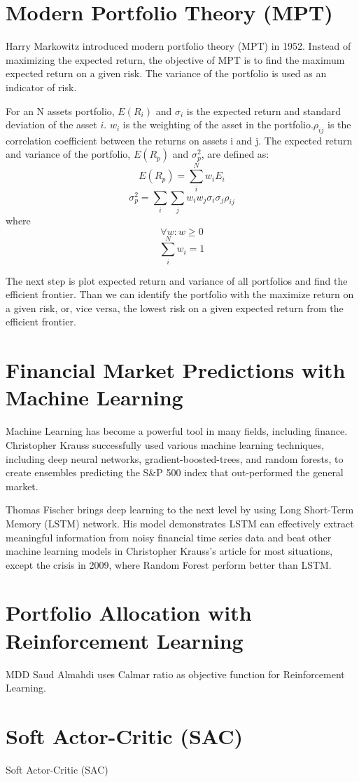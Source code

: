 \section{Modern Portfolio Theory (MPT)}
Harry Markowitz introduced modern portfolio theory (MPT) in 1952. Instead of maximizing the expected return, the objective of MPT is to find the maximum expected return on a given risk. The variance of the portfolio is used as an indicator of risk. \cite{10.2307/2975974}
\par
For an N assets portfolio, \(E(R_i)\) and  \(\sigma_i\) is the expected return and standard deviation of the asset \(i\). \(w_i\) is the weighting of the asset in the portfolio.\(\rho_{ij}\) is the correlation coefficient between the returns on assets i and j.
The expected return and variance of the portfolio, \(E(R_p)\) and \(\sigma_p^2\), are defined as:
\[ E(R_p) = \sum_i^N w_i E_i\]
\[\sigma_p^2 = \sum_i \sum_j w_i w_j \sigma_i \sigma_j \rho_{ij}\]
where
\[\forall w: w \geq 0\]
\[\sum_i ^N w_i = 1\]
\par
The next step is plot expected return and variance of all portfolios and find the efficient frontier. Than we can identify the portfolio with the maximize return on a given risk, or, vice versa, the lowest risk on a given expected return from the efficient frontier.

\section{Financial Market Predictions with Machine Learning}
Machine Learning has become a powerful tool in many fields, including finance. Christopher Krauss successfully used various machine learning techniques, including deep neural networks, gradient-boosted-trees, and random forests, to create ensembles predicting the S\&P 500 index that out-performed the general market. \cite{KRAUSS2017689} 
\par

Thomas Fischer brings deep learning to the next level by using Long Short-Term Memory (LSTM) network.\cite{FISCHER2018654} His model demonstrates LSTM can effectively extract meaningful information from noisy financial time series data and beat other machine learning models in  Christopher Krauss's article  \cite{KRAUSS2017689} for most situations, except the crisis in 2009, where Random Forest perform better than LSTM.

\section{Portfolio Allocation with Reinforcement Learning}
MDD\cite{magdon2004maximum}
Saud Almahdi uses Calmar ratio as objective function for Reinforcement Learning.
\cite{AdaptivePortfolioTradingSystem}
\section{Soft Actor-Critic (SAC)}
Soft Actor-Critic (SAC)\cite{haarnoja2018soft}

